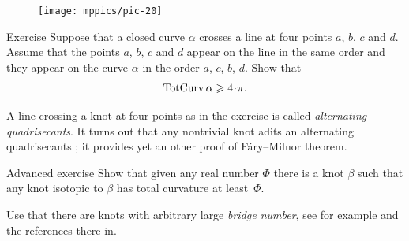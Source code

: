 \begin{figure}
\vskip-0mm
\centering
\texttt{[image: mppics/pic-20]}
\vskip0mm
\end{figure}

\begin{thm}{Exercise}
Suppose that a closed curve $\alpha$ crosses a line at four points $a$, $b$, $c$ and $d$.
Assume that the points $a$, $b$, $c$ and $d$ appear on the line in the same order and they appear on the curve $\alpha$ in the order $a$, $c$, $b$, $d$.
Show that 
\[\tc\alpha\ge 4\cdot\pi.\]
\end{thm}

A line crossing a knot at four points as in the exercise is called \emph{alternating quadrisecants}.
It turns out that any nontrivial knot adits an alternating quadrisecants \cite{denne};
it provides yet an other proof of F\'ary--Milnor theorem.


\begin{thm}{Advanced exercise}
Show that given any real number $\Phi$ there is a knot $\beta$ such that any knot isotopic to $\beta$ has total curvature at least~$\Phi$.   
\end{thm}

 Use that there are knots with arbitrary large \emph{bridge number}, see for example \cite{schultens} and the references there in.



